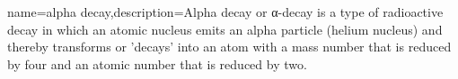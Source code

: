 {name=alpha decay,description={Alpha decay or α-decay is a type of radioactive decay in which an atomic nucleus emits an alpha particle (helium nucleus) and thereby transforms or 'decays' into an atom with a mass number that is reduced by four and an atomic number that is reduced by two.}}
